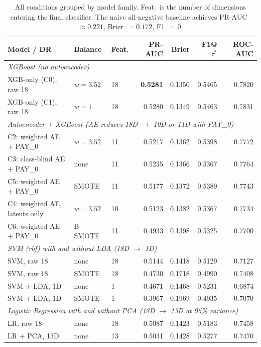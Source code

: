 \documentclass[12pt,a4paper]{article}
\begin{document}
\begin{table}[H]
\centering
\caption{All conditions grouped by model family. Feat.\ is the number of
         dimensions entering the final classifier. The naive all-negative
         baseline achieves PR-AUC~$\approx 0.221$, Brier~$= 0.172$, F1~$= 0$.}
\label{tab:cross_model}
\small
\begin{tabular}{lllrrrr}
\toprule
Model / DR & Balance & Feat. & PR-AUC & Brier & F1@$\tau^*$ & ROC-AUC \\
\midrule
\multicolumn{7}{l}{\textit{XGBoost (no autoencoder)}} \\
XGB-only (C0), raw 18       & $w=3.52$ & 18 & \textbf{0.5281} & 0.1350 & 0.5465 & 0.7820 \\
XGB-only (C1), raw 18       & $w=1$    & 18 & 0.5280          & 0.1349 & 0.5463 & 0.7831 \\
\midrule
\multicolumn{7}{l}{\textit{Autoencoder + XGBoost (AE reduces 18D $\to$ 10D or 11D with PAY\_0)}} \\
C2: weighted AE + PAY\_0    & $w=3.52$ & 11 & 0.5217 & 0.1362 & 0.5398 & 0.7772 \\
C3: class-blind AE + PAY\_0 & none     & 11 & 0.5235 & 0.1366 & 0.5367 & 0.7764 \\
C5: weighted AE + PAY\_0    & SMOTE    & 11 & 0.5177 & 0.1372 & 0.5389 & 0.7743 \\
C4: weighted AE, latents only & $w=3.52$ & 10 & 0.5123 & 0.1382 & 0.5367 & 0.7734 \\
C6: weighted AE + PAY\_0    & B-SMOTE  & 11 & 0.4933 & 0.1398 & 0.5325 & 0.7700 \\
\midrule
\multicolumn{7}{l}{\textit{SVM (rbf) with and without LDA (18D $\to$ 1D)}} \\
SVM, raw 18                  & none  & 18 & 0.5144 & 0.1418 & 0.5129 & 0.7127 \\
SVM, raw 18                  & SMOTE & 18 & 0.4730 & 0.1718 & 0.4990 & 0.7408 \\
SVM + LDA, 1D                & none  &  1 & 0.4671 & 0.1468 & 0.5231 & 0.6874 \\
SVM + LDA, 1D                & SMOTE &  1 & 0.3967 & 0.1969 & 0.4935 & 0.7070 \\
\midrule
\multicolumn{7}{l}{\textit{Logistic Regression with and without PCA (18D $\to$ 13D at 95\% variance)}} \\
LR, raw 18                   & none      & 18 & 0.5087 & 0.1423 & 0.5183 & 0.7458 \\
LR + PCA, 13D                & none      & 13 & 0.5031 & 0.1428 & 0.5277 & 0.7470 \\

\end{tabular}
\end{table}
\end{document}
